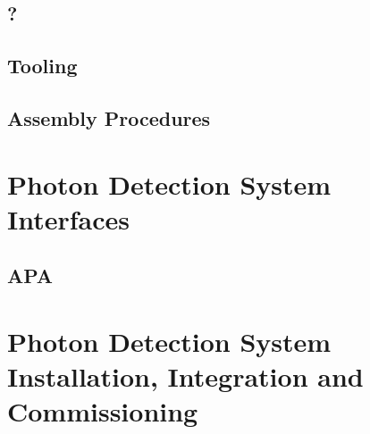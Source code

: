\subsection{}
\label{sec:fdsp-pd-?}

\subsection{?}
\label{sec:fdsp-pd-??}


\subsection{Tooling}
\label{sec:fdsp-pd-tooling}


\subsection{Assembly Procedures}
\label{sec:fdsp-pd-assy}



\section{Photon Detection System Interfaces}
\label{sec:fdsp-pd-intfc}



\subsection{APA}
\label{sec:fdsp-pd-intfc-apa}


\subsection{}
\label{sec:fdsp-pd-intfc-?}


\section{Photon Detection System Installation, Integration and Commissioning}
\label{sec:fdsp-pd-install}

